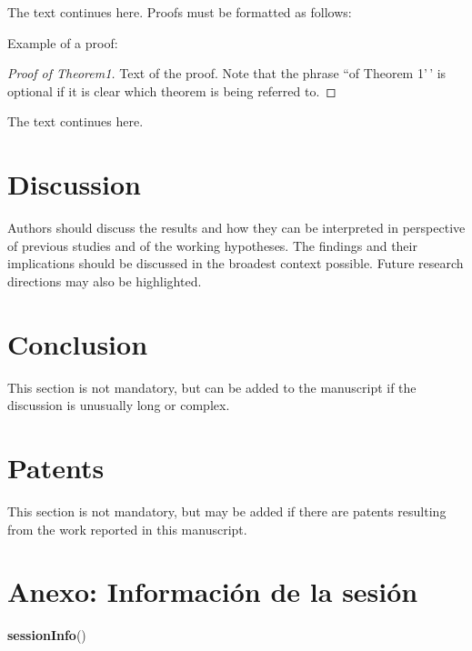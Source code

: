\documentclass[notspecified,article,submit,moreauthors,pdftex]{Definitions/mdpi}
\newenvironment{Shaded}{\begin{snugshade}}{\end{snugshade}}
\newcommand{\FunctionTok}[1]{\textcolor[rgb]{0.13,0.29,0.53}{\textbf{#1}}}
\newcommand{\NormalTok}[1]{#1}
\begin{document}
The text continues here. Proofs must be formatted as follows:

Example of a proof:

\begin{proof}[Proof of Theorem1]
Text of the proof. Note that the phrase ``of Theorem 1'\,' is optional
if it is clear which theorem is being referred to.

\end{proof}

The text continues here.

\section{Discussion}\label{discussion}

Authors should discuss the results and how they can be interpreted in
perspective of previous studies and of the working hypotheses. The
findings and their implications should be discussed in the broadest
context possible. Future research directions may also be highlighted.

\section{Conclusion}\label{conclusion}

This section is not mandatory, but can be added to the manuscript if the
discussion is unusually long or complex.

\section{Patents}\label{patents}

This section is not mandatory, but may be added if there are patents
resulting from the work reported in this manuscript.

\section{Anexo: Información de la
sesión}\label{anexo-informaciuxf3n-de-la-sesiuxf3n}

\begin{Shaded}
\begin{Highlighting}[]
\FunctionTok{sessionInfo}\NormalTok{()}
\end{Highlighting}
\end{Shaded}
\end{document}
